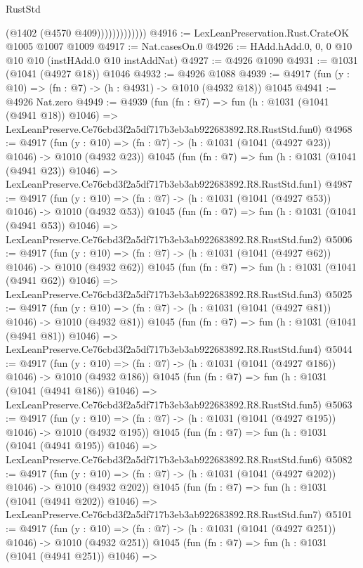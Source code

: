 \begin{lexlean}{RustStd}
\begin{coremodule}
                          (@1402 (@4570 @409)))))))))))))
@4916 := LexLeanPreservation.Rust.CrateOK @1005 @1007 @1009
@4917 := Nat.casesOn.{0}
@4926 := HAdd.hAdd.{0, 0, 0} @10 @10 @10 (instHAdd.{0} @10 instAddNat)
@4927 := @4926 @1090
@4931 := @1031 (@1041 (@4927 @18)) @1046
@4932 := @4926 @1088
@4939 := @4917 (fun (y : @10) => (fn : @7) -> (h : @4931) -> @1010 (@4932 @18)) @1045
@4941 := @4926 Nat.zero
@4949 := @4939
    (fun (fn : @7) =>
    fun (h : @1031 (@1041 (@4941 @18)) @1046) =>
    LexLeanPreserve.Ce76cbd3f2a5df717b3eb3ab922683892.R8.RustStd.fun0)
@4968 := @4917
    (fun (y : @10) => (fn : @7) -> (h : @1031 (@1041 (@4927 @23)) @1046) -> @1010 (@4932 @23))
    @1045
    (fun (fn : @7) =>
    fun (h : @1031 (@1041 (@4941 @23)) @1046) =>
    LexLeanPreserve.Ce76cbd3f2a5df717b3eb3ab922683892.R8.RustStd.fun1)
@4987 := @4917
    (fun (y : @10) => (fn : @7) -> (h : @1031 (@1041 (@4927 @53)) @1046) -> @1010 (@4932 @53))
    @1045
    (fun (fn : @7) =>
    fun (h : @1031 (@1041 (@4941 @53)) @1046) =>
    LexLeanPreserve.Ce76cbd3f2a5df717b3eb3ab922683892.R8.RustStd.fun2)
@5006 := @4917
    (fun (y : @10) => (fn : @7) -> (h : @1031 (@1041 (@4927 @62)) @1046) -> @1010 (@4932 @62))
    @1045
    (fun (fn : @7) =>
    fun (h : @1031 (@1041 (@4941 @62)) @1046) =>
    LexLeanPreserve.Ce76cbd3f2a5df717b3eb3ab922683892.R8.RustStd.fun3)
@5025 := @4917
    (fun (y : @10) => (fn : @7) -> (h : @1031 (@1041 (@4927 @81)) @1046) -> @1010 (@4932 @81))
    @1045
    (fun (fn : @7) =>
    fun (h : @1031 (@1041 (@4941 @81)) @1046) =>
    LexLeanPreserve.Ce76cbd3f2a5df717b3eb3ab922683892.R8.RustStd.fun4)
@5044 := @4917
    (fun (y : @10) => (fn : @7) -> (h : @1031 (@1041 (@4927 @186)) @1046) -> @1010 (@4932 @186))
    @1045
    (fun (fn : @7) =>
    fun (h : @1031 (@1041 (@4941 @186)) @1046) =>
    LexLeanPreserve.Ce76cbd3f2a5df717b3eb3ab922683892.R8.RustStd.fun5)
@5063 := @4917
    (fun (y : @10) => (fn : @7) -> (h : @1031 (@1041 (@4927 @195)) @1046) -> @1010 (@4932 @195))
    @1045
    (fun (fn : @7) =>
    fun (h : @1031 (@1041 (@4941 @195)) @1046) =>
    LexLeanPreserve.Ce76cbd3f2a5df717b3eb3ab922683892.R8.RustStd.fun6)
@5082 := @4917
    (fun (y : @10) => (fn : @7) -> (h : @1031 (@1041 (@4927 @202)) @1046) -> @1010 (@4932 @202))
    @1045
    (fun (fn : @7) =>
    fun (h : @1031 (@1041 (@4941 @202)) @1046) =>
    LexLeanPreserve.Ce76cbd3f2a5df717b3eb3ab922683892.R8.RustStd.fun7)
@5101 := @4917
    (fun (y : @10) => (fn : @7) -> (h : @1031 (@1041 (@4927 @251)) @1046) -> @1010 (@4932 @251))
    @1045
    (fun (fn : @7) =>
    fun (h : @1031 (@1041 (@4941 @251)) @1046) =>

\end{coremodule}
\end{lexlean}
